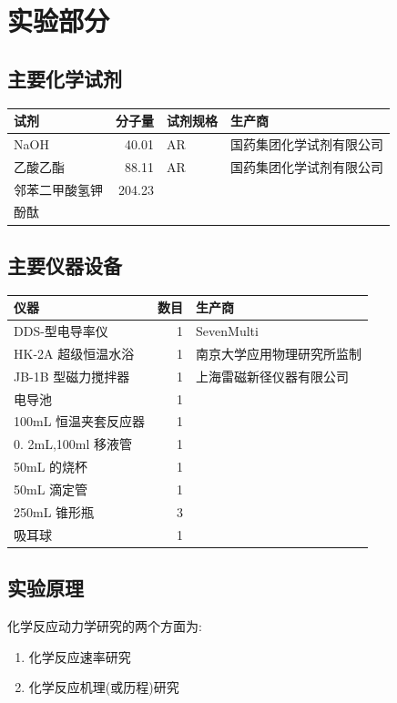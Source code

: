 \documentclass[11pt]{article}
\begin{document}
\section{实验部分}
\label{sec:orge6ac875}
\subsection{主要化学试剂}
\label{sec:orge49c772}
\begin{center}
\begin{tabular}{lrll}
试剂 & 分子量 & 试剂规格 & 生产商\\
\hline
NaOH & 40.01 & AR & 国药集团化学试剂有限公司\\
乙酸乙酯 & 88.11 & AR & 国药集团化学试剂有限公司\\
邻苯二甲酸氢钾 & 204.23 &  & \\
酚酞 &  &  & \\
\end{tabular}
\end{center}

\subsection{主要仪器设备}
\label{sec:orgcea5e40}
\begin{center}
\begin{tabular}{lrl}
仪器 & 数目 & 生产商\\
\hline
DDS-型电导率仪 & 1 & SevenMulti\\
HK-2A 超级恒温水浴 & 1 & 南京大学应用物理研究所监制\\
JB-1B 型磁力搅拌器 & 1 & 上海雷磁新径仪器有限公司\\
电导池 & 1 & \\
100mL 恒温夹套反应器 & 1 & \\
0. 2mL,100ml 移液管 & 1 & \\
50mL 的烧杯 & 1 & \\
50mL 滴定管 & 1 & \\
250mL 锥形瓶 & 3 & \\
吸耳球 & 1 & \\
\end{tabular}
\end{center}

\subsection{实验原理}
\label{sec:org062f04c}
化学反应动力学研究的两个方面为:
\begin{enumerate}
\item 化学反应速率研究
\item 化学反应机理(或历程)研究
\end{enumerate}
\end{document}
